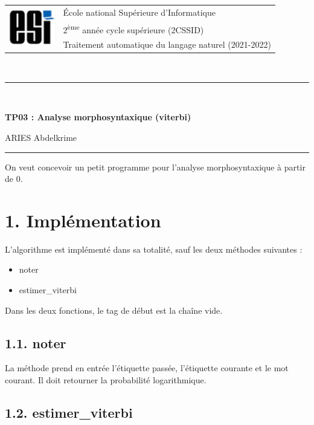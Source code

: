 \documentclass[11pt, a4paper]{article}
\begin{document}

\noindent
\begin{tabular}{ll}
\multirow{3}{*}{\includegraphics[width=2cm]{../../../img/esi-logo.png}} & \'Ecole national Supérieure d'Informatique\\
& 2\textsuperscript{ème} année cycle supérieure (2CSSID)\\
& Traitement automatique du langage naturel (2021-2022)
\end{tabular}\\[.25cm]
\noindent\rule{\textwidth}{1pt}\\%
\begin{center}
{\LARGE \textbf{TP03 : Analyse morphosyntaxique (viterbi)}}
\begin{flushright}
	ARIES Abdelkrime
\end{flushright}
\end{center}
\noindent\rule{\textwidth}{1pt}

On veut concevoir un petit programme pour l'analyse morphosyntaxique à partir de 0. 


\section*{1. Implémentation}

L'algorithme est implémenté dans sa totalité, sauf les deux méthodes suivantes :
\begin{itemize}
	\item noter
	\item estimer\_viterbi
\end{itemize}
Dans les deux fonctions, le tag de début est la chaîne vide. 

\subsection*{1.1. noter}

La méthode prend en entrée l'étiquette passée, l'étiquette courante et le mot courant.
Il doit retourner la probabilité logarithmique.

\subsection*{1.2. estimer\_viterbi}
\end{document}
